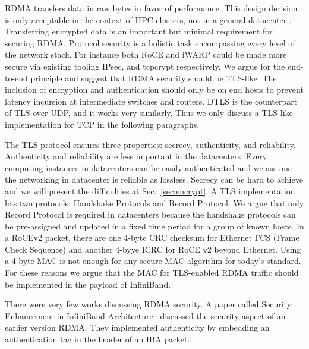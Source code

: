 RDMA transfers data in raw bytes in favor of performance. This design decision
is only acceptable in the context of HPC clusters, not in a general datacenter .
Transferring encrypted data is an important but minimal requirement for securing
RDMA.  Protocol security is a holistic task encompassing every level of the
network stack. For instance both RoCE and iWARP could be made more secure via
existing tooling IPsec, and tcpcrypt respectively.  We argue for the end-to-end
principle and suggest that RDMA security should be TLS-like.  The inclusion of
encryption and authentication should only be on end hosts to prevent latency
incursion at intermediate switches and routers. DTLS is the counterpart of TLS
over UDP, and it works very similarly. Thus we only discuss a TLS-like
implementation for TCP in the following paragraphs.

The TLS protocol ensures three properties: secrecy, authenticity, and
reliability. Authenticity and reliability are less important in the datacenters.
Every computing instances in datacenters can be easily authenticated and we
assume the networking in datacenter is reliable as lossless. Secrecy can be hard
to achieve and we will present the difficulties at Sec.~\ref{sec:encrypt}. A TLS
implementation has two protocols: Handshake Protocols and Record Protocol. We
argue that only Record Protocol is required in datacenters because the handshake
protocols can be pre-assigned and updated in a fixed time period for a group of
known hosts. In a RoCEv2 packet, there are one 4-byte CRC checksum for Ethernet
FCS (Frame Check Sequence) and another 4-byye ICRC for RoCE v2 beyond Ethernet.
Using a 4-byte MAC is not enough for any secure MAC algorithm for today's
standard. For these reasons we argue that the MAC for TLS-enabled RDMA traffic
should be implemented in the payload of InfiniBand.

There were very few works discussing RDMA security. A paper called Security Enhancement in InfiniBand
Architecture~\cite{Lee:2005:SEI:1053727.1054449} discussed the security aspect of an earlier version RDMA.  
They implemented authenticity by embedding an authentication tag in the header of an IBA packet.
